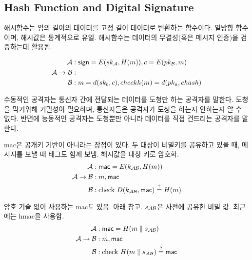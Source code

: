 \subsection*{Hash Function and Digital Signature}

해시함수는 임의 길이의 데이터를 고정 길이 데이터로 변환하는 함수이다. 일방향
함수이며, 해시값은 통계적으로 유일. 해시함수는 데이터의 무결성(혹은 메시지 인증)을 검증하는데
활용됨.

\begin{equation}
  \begin{split}
    \mathcal{A} &: \textsf{sign} = E(sk_{\mathcal{A}}, H(m)), c = E(pk_{\mathcal{B}}, m) \\
    \mathcal{A} \to \mathcal{B} &: \\
    \mathcal{B} &: m = d(sk_b, c), check h(m) = d(pk_a, ehash)
  \end{split}
\end{equation}


수동적인 공격자는 통신자 간에 전달되는 데이터를 도청만 하는 공격자를 말한다.
도청을 막기위해 기밀성이 필요하며, 통신자들은 공격자가 도청을 하는지 안하는지 알
수 없다. 반면에 능동적인 공격자는 도청뿐만 아니라 데이터를 직접 건드리는
공격자를 말한다.

mac은 공개키 기반이 아니라는 장점이 있다. 두 대상이 비밀키를 공유하고 있을 때,
메시지를 보낼 때 태그도 함께 보냄. 해시값을 대칭 키로 암호화.
\begin{equation}
  \begin{split}
    \mathcal{A} &: \textsf{mac} = E(k_{\mathcal{A} \mathcal{B}}, H(m)) \\
    \mathcal{A} \to \mathcal{B} &: m, \textsf{mac} \\
    \mathcal{B} &: \text{check } D(k_{\mathcal{A} \mathcal{B}}, \textsf{mac}) \overset{?}{=} H(m)
  \end{split}
\end{equation}

암호 기술 없이 사용하는 mac도 있음. 아래 참고. $s_{\mathcal{A} \mathcal{B}}$은 사전에 공유한 비밀 값.
최근에는 hmac을 사용함.
\begin{equation}
  \begin{split}
    \mathcal{A} &: \textsf{mac} = H(m \parallel s_{\mathcal{A} \mathcal{B}}) \\
    \mathcal{A} \to \mathcal{B} &: m, \textsf{mac} \\
    \mathcal{B} &: \text{check } H(m \parallel s_{\mathcal{A} \mathcal{B}}) \overset{?}{=} \textsf{mac}
  \end{split}
\end{equation}

